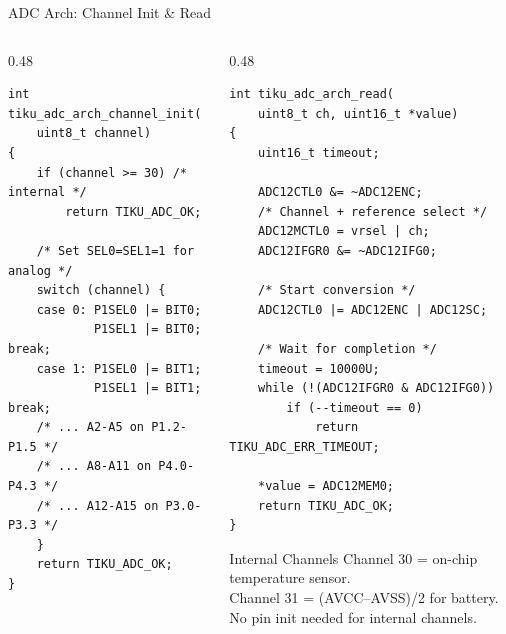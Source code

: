 \documentclass[aspectratio=169, 10pt]{beamer}
\begin{document}
\begin{frame}[fragile]{ADC Arch: Channel Init \& Read}
\begin{columns}[T]
\begin{column}{0.48\textwidth}
\begin{lstlisting}[style=cstyle, basicstyle=\ttfamily\tiny,
  title={Pin configuration per channel}]
int tiku_adc_arch_channel_init(
    uint8_t channel)
{
    if (channel >= 30) /* internal */
        return TIKU_ADC_OK;

    /* Set SEL0=SEL1=1 for analog */
    switch (channel) {
    case 0: P1SEL0 |= BIT0;
            P1SEL1 |= BIT0; break;
    case 1: P1SEL0 |= BIT1;
            P1SEL1 |= BIT1; break;
    /* ... A2-A5 on P1.2-P1.5 */
    /* ... A8-A11 on P4.0-P4.3 */
    /* ... A12-A15 on P3.0-P3.3 */
    }
    return TIKU_ADC_OK;
}
\end{lstlisting}
\end{column}

\begin{column}{0.48\textwidth}
\begin{lstlisting}[style=cstyle, basicstyle=\ttfamily\tiny,
  title={Single-conversion read}]
int tiku_adc_arch_read(
    uint8_t ch, uint16_t *value)
{
    uint16_t timeout;

    ADC12CTL0 &= ~ADC12ENC;
    /* Channel + reference select */
    ADC12MCTL0 = vrsel | ch;
    ADC12IFGR0 &= ~ADC12IFG0;

    /* Start conversion */
    ADC12CTL0 |= ADC12ENC | ADC12SC;

    /* Wait for completion */
    timeout = 10000U;
    while (!(ADC12IFGR0 & ADC12IFG0))
        if (--timeout == 0)
            return TIKU_ADC_ERR_TIMEOUT;

    *value = ADC12MEM0;
    return TIKU_ADC_OK;
}
\end{lstlisting}

\vspace{0.3em}
\begin{block}{Internal Channels}
Channel 30 = on-chip temperature sensor.\\
Channel 31 = (AVCC--AVSS)/2 for battery.\\
No pin init needed for internal channels.
\end{block}
\end{column}
\end{columns}
\end{frame}
\end{document}
